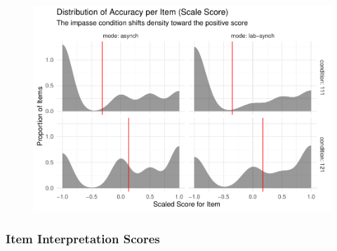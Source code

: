 \documentclass[
  letterpaper,
  DIV=11,
  numbers=noendperiod]{scrreprt}
\begin{document}
\begin{figure}[H]

{\centering \includegraphics{analysis/SGC3A/3_sgc3A_description_files/figure-pdf/VIS-ITEM-SCALED-1.pdf}

}

\end{figure}

\hypertarget{item-interpretation-scores}{%
\subsubsection{Item Interpretation
Scores}\label{item-interpretation-scores}}
\end{document}
